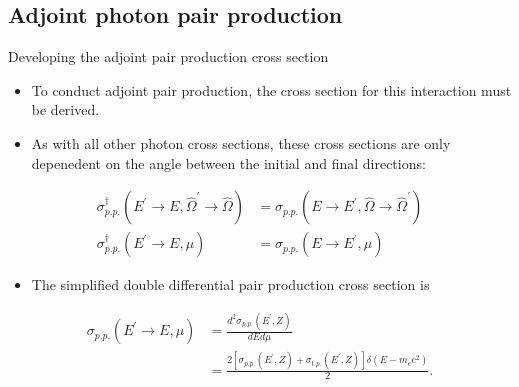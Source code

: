 \documentclass{beamer}
\begin{document}
\subsection{Adjoint photon pair production}
\begin{frame}{Developing the adjoint pair production cross section}

  \begin{itemize}
    \item To conduct adjoint pair production, the cross section for this
      interaction must be derived.
    \item As with all other photon cross sections, these cross sections are
      only depenedent on the angle between the initial and final directions:
  \end{itemize}
  \begin{align}
    \sigma_{p.p.}^{\dagger}(E^{'} \to E, \hat{\Omega}^{'} \to \hat{\Omega}) & = 
    \sigma_{p.p.}(E \to E^{'}, \hat{\Omega} \to \hat{\Omega}^{'}) \nonumber \\
    \sigma_{p.p.}^{\dagger}(E^{'} \to E,\mu) & =  
    \sigma_{p.p.}(E \to E^{'},\mu) \nonumber
  \end{align}

  \begin{itemize}
    \item The simplified double differential pair production cross section is
  \end{itemize}
  \begin{align}
    \sigma_{p.p.}(E^{'} \to E,\mu) & = \frac{d^2\sigma_{p.p.}(E^{'},Z)}{dEd\mu} 
    \nonumber \\
    & = \frac{2 [\sigma_{p.p.}(E^{'},Z) + \sigma_{t.p.}(E^{'},Z)] 
      \delta(E - m_ec^2)}{2}. \nonumber
  \end{align}
  
\end{frame}
\end{document}
